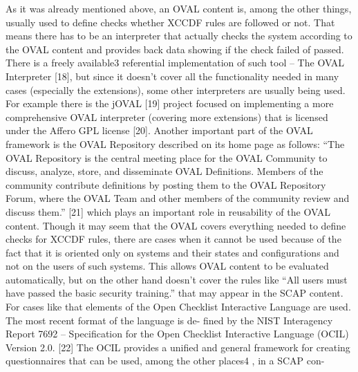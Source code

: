 \documentclass[../main.tex]{subfiles}
\begin{document}
As it was already mentioned above, an OVAL content is, among
the other things, usually used to define checks whether XCCDF rules
are followed or not. That means there has to be an interpreter that
actually checks the system according to the OVAL content and provides
back data showing if the check failed of passed. There is a freely
available3
referential implementation of such tool – The OVAL Interpreter
[18], but since it doesn’t cover all the functionality needed
in many cases (especially the extensions), some other interpreters
are usually being used. For example there is the jOVAL [19] project
focused on implementing a more comprehensive OVAL interpreter
(covering more extensions) that is licensed under the Affero GPL license
[20].
Another important part of the OVAL framework is the OVAL
Repository described on its home page as follows:
“The OVAL Repository is the central meeting place for
the OVAL Community to discuss, analyze, store, and
disseminate OVAL Definitions. Members of the community
contribute definitions by posting them to the
OVAL Repository Forum, where the OVAL Team and
other members of the community review and discuss
them.” [21]
which plays an important role in reusability of the OVAL content.
Though it may seem that the OVAL covers everything needed
to define checks for XCCDF rules, there are cases when it cannot
be used because of the fact that it is oriented only on systems and
their states and configurations and not on the users of such systems.
This allows OVAL content to be evaluated automatically, but
on the other hand doesn’t cover the rules like “All users must have
passed the basic security training.” that may appear in the SCAP content.
For cases like that elements of the Open Checklist Interactive
Language are used. The most recent format of the language is de-
fined by the NIST Interagency Report 7692 – Specification for the
Open Checklist Interactive Language (OCIL) Version 2.0. [22] The
OCIL provides a unified and general framework for creating questionnaires
that can be used, among the other places4
, in a SCAP con-
\end{document}
